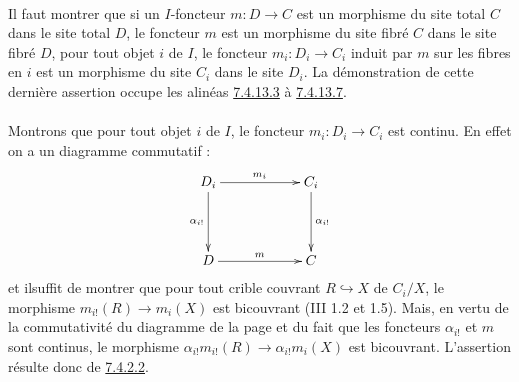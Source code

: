 \documentclass[10pt]{../fichiers-configuration-latex/smfart}
\begin{document}
\paragraph{}

Il faut montrer que si un $I$-foncteur $m : D \to C$ est un morphisme
du site total $C$ dans le site total $D$, le foncteur $m$ est un
morphisme du site fibré $C$ dans le site fibré $D$, \ie pour tout
objet $i$ de $I$, le foncteur $m_i : D_i \to C_i$ induit par $m$ sur
les fibres en $i$ est un morphisme du site $C_i$ dans le site
$D_i$. La démonstration de cette dernière assertion occupe les alinéas
\hyperref[VI.par7.4.13.3]{7.4.13.3} à \hyperref[VI.par7.4.13.7]{7.4.13.7}.

\paragraph{}
Montrons que pour tout objet $i$ de $I$, le foncteur $m_i : D_i \to
C_i$ est continu. En effet on a un diagramme commutatif :
\[
\xymatrix@C=2cm@R=1.5cm{
D_i \ar[r]^{m_i} \ar[d]_{\alpha_{i!}}& C_i \ar[d]^{\alpha_{i!}}\\
D   \ar[r]^{m}& C
}
\]
et il\pageoriginale suffit de montrer que pour tout crible couvrant $R
\hookrightarrow X$ de $C_i / X$, le morphisme $m_{i!} (R) \to m_i(X)$
est bicouvrant (III 1.2 et 1.5). Mais, en vertu de la commutativité du
diagramme de la page  et du fait que les foncteurs $\alpha_{i!}$ et
$m$ sont continus, le morphisme $\alpha_{i!} m_{i!} (R) \to
\alpha_{i!} m_{i} (X)$ est bicouvrant. L'assertion résulte donc de
\hyperref[VI.lem7.4.2.2]{7.4.2.2}.
\end{document}
